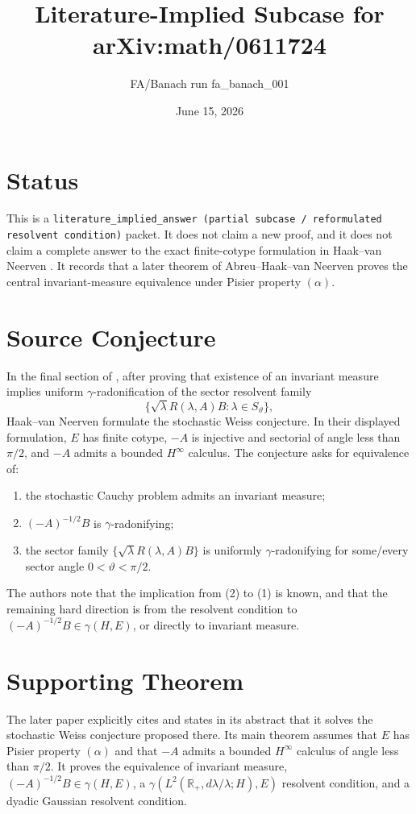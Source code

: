 \documentclass[11pt]{article}
\title{Literature-Implied Subcase for arXiv:math/0611724}
\author{FA/Banach run fa\_banach\_001}
\date{June 15, 2026}
\newcommand{\ga}{\gamma}
\newcommand{\R}{\mathbb{R}}
\begin{document}
\maketitle

\section*{Status}

This is a \texttt{literature\_implied\_answer (partial subcase /
reformulated resolvent condition)} packet. It does not claim a new proof, and
it does not claim a complete answer to the exact finite-cotype formulation in
Haak--van Neerven \cite{HaakNeerven2006}. It records that a later theorem of
Abreu--Haak--van Neerven \cite{AbreuHaakNeerven2012} proves the central
invariant-measure equivalence under Pisier property $(\alpha)$.

\section*{Source Conjecture}

In the final section of \cite{HaakNeerven2006}, after proving that existence
of an invariant measure implies uniform $\ga$-radonification of the sector
resolvent family
\[
  \{\sqrt{\lambda}R(\lambda,A)B:\lambda\in S_\vartheta\},
\]
Haak--van Neerven formulate the stochastic Weiss conjecture. In their displayed
formulation, $E$ has finite cotype, $-A$ is injective and sectorial of angle
less than $\pi/2$, and $-A$ admits a bounded $H^\infty$ calculus. The conjecture
asks for equivalence of:
\begin{enumerate}
  \item the stochastic Cauchy problem admits an invariant measure;
  \item $(-A)^{-1/2}B$ is $\ga$-radonifying;
  \item the sector family $\{\sqrt{\lambda}R(\lambda,A)B\}$ is uniformly
  $\ga$-radonifying for some/every sector angle $0<\vartheta<\pi/2$.
\end{enumerate}
The authors note that the implication from (2) to (1) is known, and that the
remaining hard direction is from the resolvent condition to
$(-A)^{-1/2}B\in\ga(H,E)$, or directly to invariant measure.

\section*{Supporting Theorem}

The later paper \cite{AbreuHaakNeerven2012} explicitly cites
\cite{HaakNeerven2006} and states in its abstract that it solves the stochastic
Weiss conjecture proposed there. Its main theorem assumes that $E$ has
Pisier property $(\alpha)$ and that $-A$ admits a bounded $H^\infty$ calculus
of angle less than $\pi/2$. It proves the equivalence of invariant measure,
$(-A)^{-1/2}B\in\ga(H,E)$, a $\ga(L^2(\R_+,d\lambda/\lambda;H),E)$ resolvent
condition, and a dyadic Gaussian resolvent condition.
\end{document}
